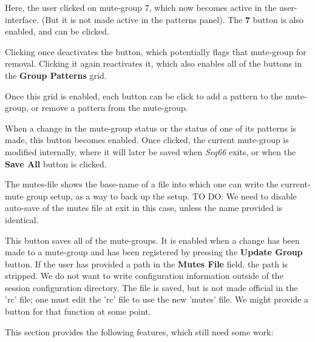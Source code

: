    Here, the user clicked on mute-group 7, which now becomes active in the
   user-interface.  (But it is not made active in the patterns panel).
   The \textbf{7} button is also enabled, and can be clicked.

   Clicking once deactivates the button, which potentially flags that mute-group
   for removal.  Clicking it again reactivates it, which also enables all of the
   buttons in the \textbf{Group Patterns} grid.

   Once this grid is enabled, each button can be click to add a pattern to the
   mute-group, or remove a pattern from the mute-group.

%
%
   When a change in the mute-group status or the status of one of its patterns
   is made, this button becomes enabled.  Once clicked, the current mute-group
   is modified internally, where it will later be saved when \textsl{Seq66}
   exits, or when the \textbf{Save All} button is clicked.

   The mutes-file shows the base-name of a file into which one can write the
   current-mute group setup, as a way to back up the setup.
   TO DO:  We need to disable auto-save of the mutes file at exit in this case,
   unless the name provided is identical.

%
%
   This button saves all of the mute-groups.
   It is enabled when a change has been made to a mute-group and
   has been registered by pressing the \textbf{Update Group} button.
   If the user has provided a path in the \textbf{Mutes File} field, the path
   is stripped.  We do not want to write configuration information outside of
   the session configuration directory.
   The file is saved, but is not made official in the
   'rc' file; one must edit the 'rc' file to use the new 'mutes' file.
   We might provide a button for that function at some point.

   This section provides the following features, which still need some work:

